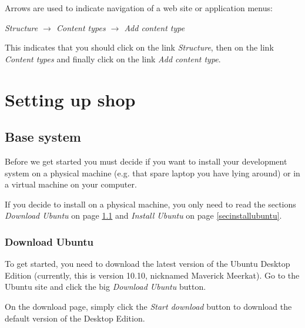 \documentclass[draft,ebook,10pt,twoside,openright]{memoir}
\begin{document}
Arrows are used to indicate navigation of a web site or application menus:

\begin{squashboxsnugshade}
\emph{Structure $\rightarrow$ Content types $\rightarrow$ Add content type}
\end{squashboxsnugshade}

This indicates that you should click on the link \emph{Structure}, then on the link \emph{Content types} and finally click on the link \emph{Add content type}.


\endgroup

\mainmatter

\part{Setting up shop}

\chapter{Base system} \label{chbasesystem}

\noindent
Before we get started you must decide if you want to install your development system on a physical machine (e.g. that spare laptop you have lying around) or in a virtual machine on your computer.

If you decide to install on a physical machine, you only need to read the sections \emph{Download Ubuntu} on page \ref{secdownloadubuntu} and \emph{Install Ubuntu} on page \ref{secinstallubuntu}.

\section{Download Ubuntu} \label{secdownloadubuntu}

To get started, you need to download the latest version of the Ubuntu Desktop Edition (currently, this is version 10.10, nicknamed Maverick Meerkat). Go to the Ubuntu site and click the big \emph{Download Ubuntu} button.


On the download page, simply click the \emph{Start download} button to download the default version of the Desktop Edition.
\end{document}
